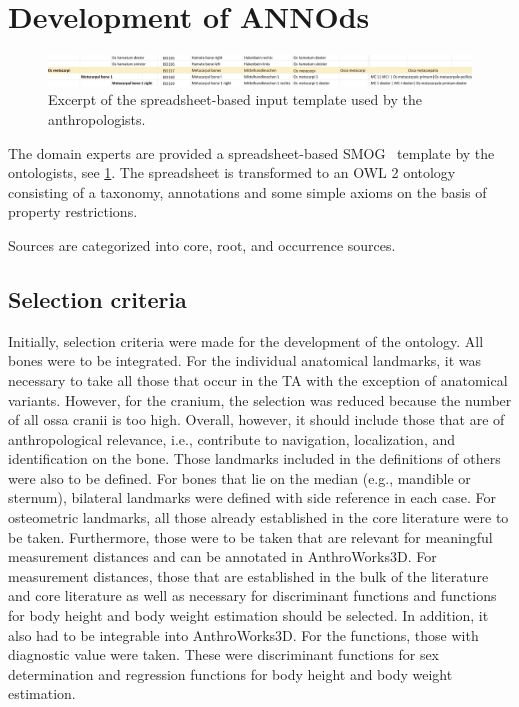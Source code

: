 \documentclass[sw]{iosart2x}
\newcommand{\aw}{AnthroWorks3D}
\begin{document}
\section{Development of ANNOds}\label{sec:domain}
\begin{figure}[h!t]
\includegraphics[width=\textwidth]{img/smog.png}
\caption{Excerpt of the spreadsheet-based input template used by the anthropologists.}\label{fig:smog}
\end{figure}

The domain experts are provided a spreadsheet-based SMOG~\citep{smog} template by the ontologists, see \cref{fig:smog}.
The spreadsheet is transformed to an OWL 2 ontology consisting of a taxonomy, annotations and some simple axioms on the basis of property restrictions.

Sources are categorized into core, root, and occurrence sources.

\subsection{Selection criteria}
Initially, selection criteria were made for the development of the ontology.
All bones were to be integrated.
For the individual anatomical landmarks, it was necessary to take all those that occur in the TA with the exception of anatomical variants.
However, for the cranium, the selection was reduced because the number of all ossa cranii is too high.
Overall, however, it should include those that are of anthropological relevance, i.e., contribute to navigation, localization, and identification on the bone.
Those landmarks included in the definitions of others were also to be defined.
For bones that lie on the median (e.g., mandible or sternum), bilateral landmarks were defined with side reference in each case.
For osteometric landmarks, all those already established in the core literature were to be taken.
Furthermore, those were to be taken that are relevant for meaningful measurement distances and can be annotated in \aw{}.
For measurement distances, those that are established in the bulk of the literature and core literature as well as necessary for discriminant functions and functions for body height and body weight estimation should be selected.
In addition, it also had to be integrable into \aw{}.
For the functions, those with diagnostic value were taken.
These were discriminant functions for sex determination and regression functions for body height and body weight estimation.
\end{document}
